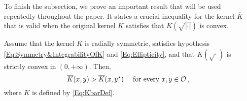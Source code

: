 To finish the subsection, we prove an important result that will be used repeatedly throughout the
paper. It states a crucial inequality for the kernel $\overline{K}$ that is valid when the original
kernel $K$ satisfies that $K(\sqrt{|\cdot|})$ is convex.

\begin{proposition}
\label{Prop:KernelInequalityReflexion} Assume that the kernel $K$ is radially symmetric, satisfies
hypothesis \eqref{Eq:Symmetry&IntegrabilityOfK} and \eqref{Eq:Ellipticity}, and that
$K(\sqrt{\cdot})$ is strictly convex in $(0,+\infty)$. Then,
\begin{equation}
\label{Eq:KernelInequalityReflexion}
\overline{K}(x,y) > \overline{K}(x, y^\star) \quad \text{ for every }x,y \in \mathcal{O}\,,
\end{equation}
where $\overline{K}$ is defined by \eqref{Eq:KbarDef}.
\end{proposition}

